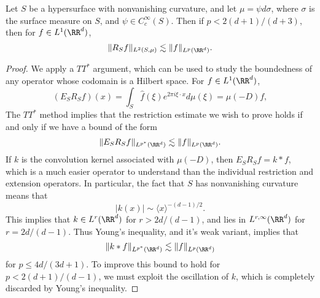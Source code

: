 \begin{theorem}
    Let $S$ be a hypersurface with nonvanishing curvature, and let $\mu = \psi d\sigma$, where $\sigma$ is the surface measure on $S$, and $\psi \in C_c^\infty(S)$. Then if $p < 2(d+1)/(d+3)$, then for $f \in L^1(\RR^d)$,
  \[ \| R_S f \|_{L^2(S,\mu)} \lesssim \| f \|_{L^p(\RR^d)}. \]
\end{theorem}
\begin{proof}
  We apply a $TT^*$ argument, which can be used to study the boundedness of any operator whose codomain is a Hilbert space. For $f \in L^1(\RR^d)$,
  \[ (E_S R_S f)(x) = \int_S \widehat{f}(\xi) e^{2\pi i \xi \cdot x} d\mu(\xi) = \mu(-D) f, \]
  The $TT^*$ method implies that the restriction estimate we wish to prove holds if and only if we have a bound of the form
  \[ \| E_S R_S f \|_{L^{p^*}(\RR^d)} \lesssim \| f \|_{L^p(\RR^d)}. \]
  If $k$ is the convolution kernel associated with $\mu(-D)$, then $E_S R_S f = k * f$, which is a much easier operator to understand than the individual restriction and extension operators. In particular, the fact that $S$ has nonvanishing curvature means that
  \[ |k(x)| \sim \langle x \rangle^{-(d-1)/2}. \]
  This implies that $k \in L^r(\RR^d)$ for $r > 2d/(d-1)$, and lies in $L^{r,\infty}(\RR^d)$ for $r = 2d/(d-1)$. Thus Young's inequality, and it's weak variant, implies that
  \[ \| k * f \|_{L^{p^*}(\RR^d)} \lesssim \| f \|_{L^p(\RR^d)} \]
  for $p \leq 4d/(3d + 1)$. To improve this bound to hold for $p < 2(d+1)/(d-1)$, we must exploit the oscillation of $k$, which is completely discarded by Young's inequality.


\end{proof}
